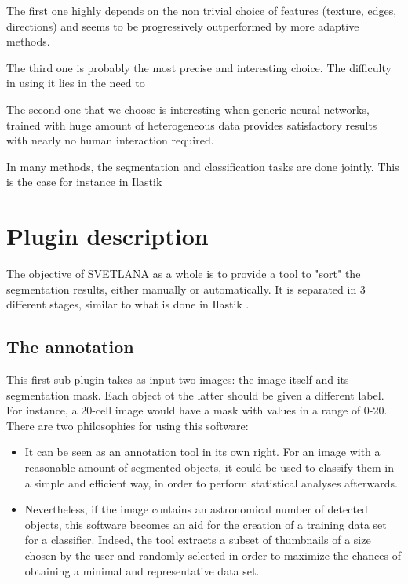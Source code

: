 \documentclass{article}
\begin{document}
The first one highly depends on the non trivial choice of features (texture, edges, directions) and seems to be progressively outperformed by more adaptive methods.

The third one is probably the most precise and interesting choice. The difficulty in using it lies in the need to 

The second one that we choose is interesting when generic neural networks, trained with huge amount of heterogeneous data provides satisfactory results with nearly no human interaction required. 

In many methods, the segmentation and classification tasks are done jointly. This is the case for instance in Ilastik \cite{berg2019ilastik}


\section{Plugin description}
\label{sec:format}
{}
The objective of SVETLANA as a whole is to provide a tool to "sort" the segmentation results, either manually or automatically. 
It is separated in 3 different stages, similar to what is done in Ilastik \cite{berg2019ilastik}. 
\subsection{The annotation}

This first sub-plugin takes as input two images: the image itself and its segmentation mask. Each object ot the latter should be given a different label. For instance, a 20-cell image would have a mask with values in a range of 0-20.
\\
There are two philosophies for using this software:
\begin{itemize}
  \item It can be seen as an annotation tool in its own right. For an image with a reasonable amount of segmented objects, it could be used to classify them in a simple and efficient way, in order to perform statistical analyses afterwards.
  \item Nevertheless, if the image contains an astronomical number of detected objects, this software becomes an aid for the creation of a training data set for a classifier. Indeed, the tool extracts a subset of thumbnails of a size chosen by the user and randomly selected in order to maximize the chances of obtaining a minimal and representative data set. 
\end{itemize}
\end{document}
